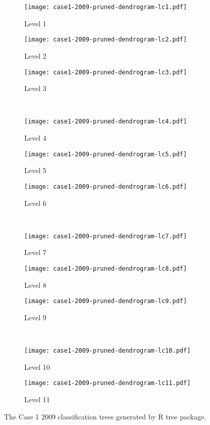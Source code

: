 \begin{appendices}

\begin{figure}[!ht] \centering
	\captionsetup[subfigure]{width=2.0in}
	\begin{subfigure}[t]{0.32\textwidth}
		\texttt{[image: case1-2009-pruned-dendrogram-lc1.pdf]}
		\caption{Level 1}
	\end{subfigure}
	\begin{subfigure}[t]{0.32\textwidth}
		\texttt{[image: case1-2009-pruned-dendrogram-lc2.pdf]}
		\caption{Level 2}
	\end{subfigure}
	\begin{subfigure}[t]{0.32\textwidth}
		\texttt{[image: case1-2009-pruned-dendrogram-lc3.pdf]}
		\caption{Level 3}
	\end{subfigure}\\
	\vspace{5pt}
	\begin{subfigure}[t]{0.32\textwidth}
		\texttt{[image: case1-2009-pruned-dendrogram-lc4.pdf]}
		\caption{Level 4}
	\end{subfigure}
	\begin{subfigure}[t]{0.32\textwidth}
		\texttt{[image: case1-2009-pruned-dendrogram-lc5.pdf]}
		\caption{Level 5}
	\end{subfigure}
	\begin{subfigure}[t]{0.32\textwidth}
		\texttt{[image: case1-2009-pruned-dendrogram-lc6.pdf]}
		\caption{Level 6}
	\end{subfigure}\\
	\vspace{5pt}	
	\begin{subfigure}[t]{0.32\textwidth}
		\texttt{[image: case1-2009-pruned-dendrogram-lc7.pdf]}
		\caption{Level 7}
	\end{subfigure}
	\begin{subfigure}[t]{0.32\textwidth}
		\texttt{[image: case1-2009-pruned-dendrogram-lc8.pdf]}
		\caption{Level 8}
	\end{subfigure}
	\begin{subfigure}[t]{0.32\textwidth}
		\texttt{[image: case1-2009-pruned-dendrogram-lc9.pdf]}
		\caption{Level 9}
	\end{subfigure}\\
	\vspace{5pt}
	\begin{subfigure}[t]{0.32\textwidth}
		\texttt{[image: case1-2009-pruned-dendrogram-lc10.pdf]}
		\caption{Level 10}
	\end{subfigure}
	\begin{subfigure}[t]{0.32\textwidth}
		\texttt{[image: case1-2009-pruned-dendrogram-lc11.pdf]}
		\caption{Level 11}
	\end{subfigure}
	\vspace{5pt}
	\caption[The Case 1 2009 classification trees generated by R tree package.]{The Case 1 2009 classification trees generated by R tree package.}
	\label{fig: appendix-fig.c5.tree}
\end{figure}


\end{appendices}
